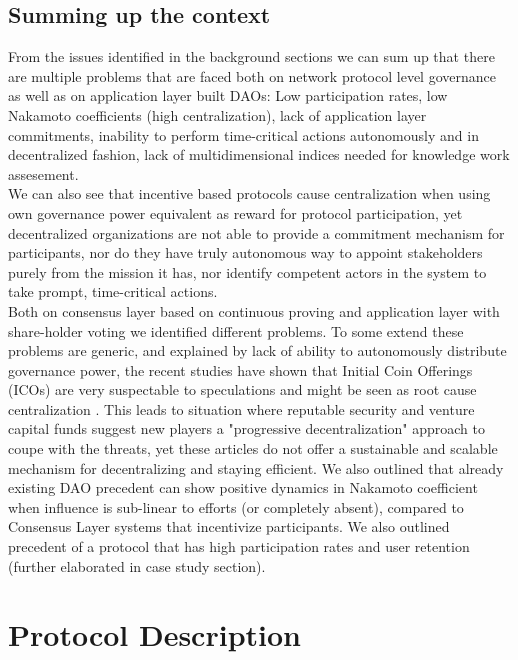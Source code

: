 \documentclass{article}
\begin{document}
\begin{CJK}{UTF8}{gbsn}
\begin{multicols}{2}
        \subsection{Summing up the context}
        From the issues identified in the background sections we can sum up that there are multiple problems that are faced both on network protocol level governance as well as on application layer built DAOs: Low participation rates, low Nakamoto coefficients (high centralization), lack of application layer commitments, inability to perform time-critical actions autonomously and in decentralized fashion, lack of multidimensional indices needed for knowledge work assesement.\\
        We can also see that incentive based protocols cause centralization when using own governance power equivalent as reward for protocol participation, yet decentralized organizations are not able to provide a commitment mechanism for participants, nor do they have truly autonomous way to appoint stakeholders purely from the mission it has, nor identify competent actors in the system to take prompt, time-critical actions.\\
        Both on consensus layer based on continuous proving and application layer with share-holder voting we identified different problems. To some extend these problems are generic, and explained by lack of ability to autonomously distribute governance power, the recent studies have shown that Initial Coin Offerings (ICOs) are very suspectable to speculations and might be seen as root cause centralization \cite{Johannes24}. This leads to situation where reputable security and venture capital funds suggest new players a "progressive decentralization" approach to coupe with the threats\cite{a16z20}\cite{Webber23}, yet these articles do not offer a sustainable and scalable mechanism for decentralizing and staying efficient.
        We also outlined that already existing DAO precedent can show positive dynamics in Nakamoto coefficient when influence is sub-linear to efforts (or completely absent), compared to Consensus Layer systems that incentivize participants. We also outlined precedent of a protocol that has high participation rates and user retention (further elaborated in case study section).\\

        \section{Protocol Description}


\end{multicols}
\end{CJK}
\end{document}
